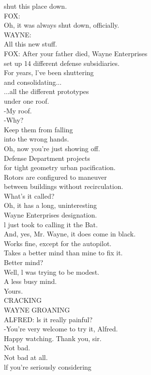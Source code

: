 \documentclass{article}
\begin{document}
\begin{multicols}{3}
shut this place down.\\
FOX:\\
Oh, it was always shut down, officially.\\
WAYNE:\\
All this new stuff.\\
FOX: After your father died, Wayne Enterprises\\
set up 14 different defense subsidiaries.\\
For years, l've been shuttering\\
and consolidating...\\
...all the different prototypes\\
under one roof.\\
-My roof.\\
-Why?\\
Keep them from falling\\
into the wrong hands.\\
Oh, now you're just showing off.\\
Defense Department projects\\
for tight geometry urban pacification.\\
Rotors are configured to maneuver\\
between buildings without recirculation.\\
What's it called?\\
Oh, it has a long, uninteresting\\
Wayne Enterprises designation.\\
l just took to calling it the Bat.\\
And, yes, Mr. Wayne, it does come in black.\\
Works fine, except for the autopilot.\\
Takes a better mind than mine to fix it.\\
Better mind?\\
Well, l was trying to be modest.\\
A less busy mind.\\
Yours.\\
CRACKING\\
WAYNE GROANING\\
ALFRED: ls it really painful?\\
-You're very welcome to try it, Alfred.\\
Happy watching. Thank you, sir.\\
Not bad.\\
Not bad at all.\\
lf you're seriously considering\\

\end{multicols}
\end{document}
